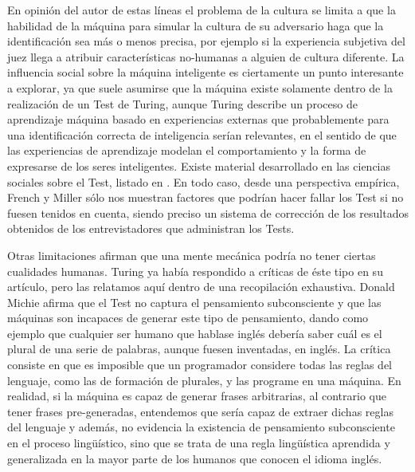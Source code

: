 \documentclass[12pt]{memoir}
\begin{document}
En opinión del autor de estas líneas el problema de la cultura se limita a que la habilidad de la máquina para simular la cultura de su adversario haga que la identificación sea más o menos precisa, por ejemplo si la experiencia subjetiva del juez llega a atribuir características no-humanas a alguien de cultura diferente. La influencia social sobre la máquina inteligente es ciertamente un punto interesante a explorar, ya que suele asumirse que la máquina existe solamente dentro de la realización de un Test de Turing, aunque Turing describe un proceso de aprendizaje máquina basado en experiencias externas \parencite[apartado 7]{Turing1950cmi} que probablemente para una identificación correcta de inteligencia serían relevantes, en el sentido de que las experiencias de aprendizaje modelan el comportamiento y la forma de expresarse de los seres inteligentes. Existe material desarrollado en las ciencias sociales sobre el Test, listado en \parencite[apartado 5]{afterTuring}. En todo caso, desde una perspectiva empírica, French y Miller sólo nos muestran factores que podrían hacer fallar los Test si no fuesen tenidos en cuenta, siendo preciso un sistema de corrección de los resultados obtenidos de los entrevistadores que administran los Tests.

Otras limitaciones afirman que una mente mecánica podría no tener ciertas cualidades humanas. Turing ya había respondido a críticas de éste tipo en su artículo, pero las relatamos aquí dentro de una recopilación exhaustiva. Donald Michie \parencite[apartado 4.3]{afterTuring} afirma que el Test no captura el pensamiento subconsciente y que las máquinas son incapaces de generar este tipo de pensamiento, dando como ejemplo que cualquier ser humano que hablase inglés debería saber cuál es el plural de una serie de palabras, aunque fuesen inventadas, en inglés. La crítica consiste en que es imposible que un programador considere todas las reglas del lenguaje, como las de formación de plurales, y las programe en una máquina. En realidad, si la máquina es capaz de generar frases arbitrarias, al contrario que tener frases pre-generadas, entendemos que sería capaz de extraer dichas reglas del lenguaje y además, no evidencia la existencia de pensamiento subconsciente en el proceso lingüístico, sino que se trata de una regla lingüística aprendida y generalizada en la mayor parte de los humanos que conocen el idioma inglés.
\end{document}
